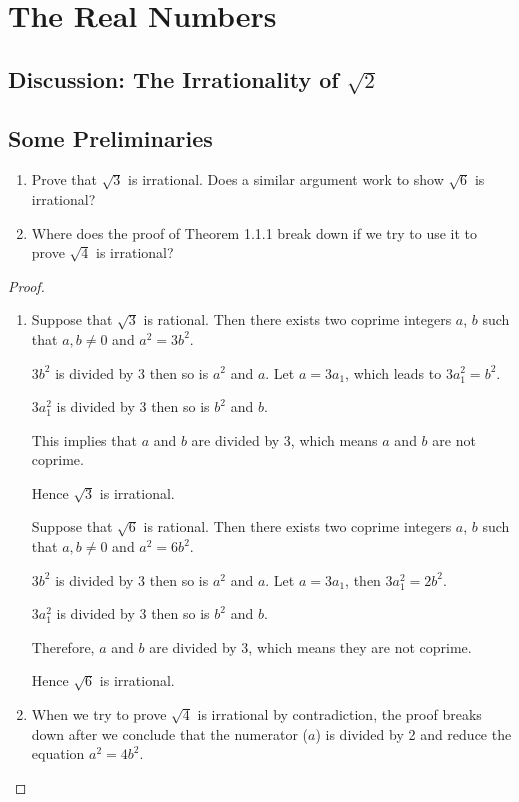 \documentclass[class=understanding-analysis,crop=false]{standalone}
\begin{document}
\chapter{The Real Numbers}

\section{Discussion: The Irrationality of $\sqrt{2}$}

\section{Some Preliminaries}

\begin{exercise}
    \begin{enumerate}[label = (\alph*)]
        \item Prove that $\sqrt{3}$ is irrational. Does a similar argument work to show $\sqrt{6}$ is irrational?
        \item Where does the proof of Theorem 1.1.1 break down if we try to use it to prove $\sqrt{4}$ is irrational?
    \end{enumerate}
\end{exercise}

\begin{proof}
    \begin{enumerate}
        \item Suppose that $\sqrt{3}$ is rational. Then there exists two coprime integers $a$, $b$ such that $a, b\ne 0$ and $a^{2} = 3b^{2}$.
              \par $3b^{2}$ is divided by 3 then so is $a^{2}$ and $a$. Let $a = 3a_{1}$, which leads to $3a_{1}^{2} = b^{2}$.
              \par $3a_{1}^{2}$ is divided by 3 then so is $b^{2}$ and $b$.
              \par This implies that $a$ and $b$ are divided by 3, which means $a$ and $b$ are not coprime.
              \par Hence $\sqrt{3}$ is irrational.
              \bigskip
              \par Suppose that $\sqrt{6}$ is rational. Then there exists two coprime integers $a$, $b$ such that $a, b \ne 0$ and $a^{2} = 6b^{2}$.
              \par $3b^{2}$ is divided by 3 then so is $a^{2}$ and $a$. Let $a = 3a_{1}$, then $3a_{1}^{2} = 2b^{2}$.
              \par $3a_{1}^{2}$ is divided by 3 then so is $b^{2}$ and $b$.
              \par Therefore, $a$ and $b$ are divided by 3, which means they are not coprime.
              \par Hence $\sqrt{6}$ is irrational.
        \item When we try to prove $\sqrt{4}$ is irrational by contradiction, the proof breaks down after we conclude that the numerator ($a$) is divided by 2 and reduce the equation $a^{2} = 4b^{2}$.
    \end{enumerate}
\end{proof}
\end{document}
